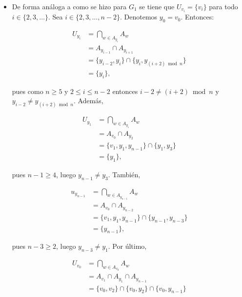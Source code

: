 \begin{Obs}
\begin{itemize}
      \item[$G_2$:] De forma análoga a como se hizo para $G_1$ se tiene que $U_{v_i}=\{v_i\}$ para todo $i\in\{2,3,\dots\}$. Sea $i\in\{2,3,\dots ,n-2\}$. Denotemos $y_0=v_0$. Entonces:
         \begin{ceqn}
         \begin{align*}
            U_{y_i} &= \bigcap_{w\in A_{y_i}}A_w \\
                    &= A_{y_{i-1}}\cap A_{y_{i+1}} \\
                    &= \{y_{i-2},y_i\}\cap \{y_i, y_{(i+2)\bmod n}\} \\
                    &= \{y_i\},
         \end{align*}
         \end{ceqn}
         pues como $n\ge 5$ y $2\le i\le n-2$ entonces $i-2\ne (i+2)\bmod n$ y $y_{i-2}\ne y_{(i+2)\bmod n}$. Además,
         \begin{ceqn}
         \begin{align*}
            U_{y_1} &= \bigcap_{w\in A_{y_1}}A_w \\
                    &= A_{v_0}\cap A_{y_2} \\
                    &= \{v_1,y_1,y_{n-1}\} \cap \{y_1,y_3\} \\
                    &= \{y_1\},
         \end{align*}
         \end{ceqn}
         pues $n-1\ge 4$, luego $y_{n-1}\ne y_3$. También,
         \begin{ceqn}
         \begin{align*}
            u_{y_{n-1}} &= \bigcap_{w\in A_{y_{n-1}}}A_w \\
                        &= A_{v_0}\cap A_{y_{n-2}} \\
                        &= \{v_1,y_1,y_{n-1}\}\cap \{y_{n-1},y_{n-3}\} \\
                        &= \{y_{n-1}\},
         \end{align*}
         \end{ceqn}
         pues $n-3\ge 2$, luego $y_{n-3}\ne y_1$. Por último,
         \begin{ceqn}
         \begin{align*}
            U_{v_0} &= \bigcap_{w\in A_{v_0}}A_w \\
                    &= A_{v_1}\cap A_{y_1}\cap A_{y_{n-1}} \\
                    &= \{v_0, v_2\}\cap \{v_0,y_2\}\cap \{v_0,y_{n-1}\} \\

\end{align*}
\end{ceqn}
\end{itemize}
\end{Obs}
